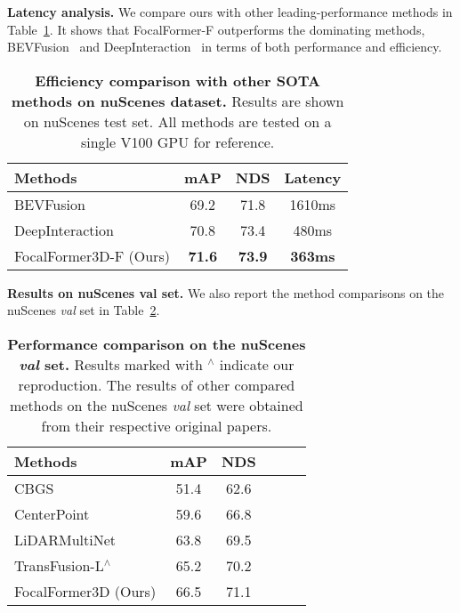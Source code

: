 \documentclass[10pt,twocolumn,letterpaper]{article}
\begin{document}
\vspace{2mm}
\noindent\textbf{Latency analysis.}
We compare ours with other leading-performance methods in Table~\ref{tab:latency}. It shows that FocalFormer-F outperforms the dominating methods, BEVFusion~\cite{bevfusion} and DeepInteraction~\cite{deepinteraction} in terms of both performance and efficiency.

\begin{table}[h]
	\begin{center}
\begin{tabular}{lccc}
		\toprule
		  Methods & mAP & NDS & Latency \\ \midrule
            BEVFusion~\cite{bevfusion} & 69.2 & 71.8 & 1610ms \\
            DeepInteraction~\cite{deepinteraction} &  70.8 & 73.4 & 480ms \\
            FocalFormer3D-F (Ours) & \textbf{71.6} & \textbf{73.9} & \textbf{363ms} \\ 
		\bottomrule
		\end{tabular}
	\end{center}
	\caption{\textbf{Efficiency comparison with other SOTA methods on nuScenes dataset.} Results are shown on nuScenes test set. All methods are tested on a single V100 GPU for reference.}\label{tab:latency}
\end{table}


\vspace{2mm}
\noindent\textbf{Results on nuScenes val set.}
We also report the method comparisons on the nuScenes \textit{val} set in Table~\ref{tab:nuscenes val result}. 

\begin{table}[h]
	\begin{center}
\begin{tabular}{lccccc}
		\toprule
		  Methods & mAP & NDS  \\ \midrule
            CBGS~\cite{cbgs} & 51.4 & 62.6 \\
            CenterPoint~\cite{centerpoint} & 59.6 & 66.8 \\
            LiDARMultiNet~\cite{ye2022lidarmultinet} & 63.8 & 69.5 \\
            TransFusion-L$^\wedge$~\cite{transfusion} & 65.2 & 70.2 \\ 
            FocalFormer3D (Ours) & 66.5 & 71.1 \\
            \bottomrule
		\end{tabular}
	\end{center}
	\caption{\textbf{Performance comparison on the nuScenes \textit{val} set.} Results marked with $^\wedge$ indicate our reproduction. The results of other compared methods on the nuScenes \textit{val} set were obtained from their respective original papers.}\label{tab:nuscenes val result}
\end{table}
\end{document}
